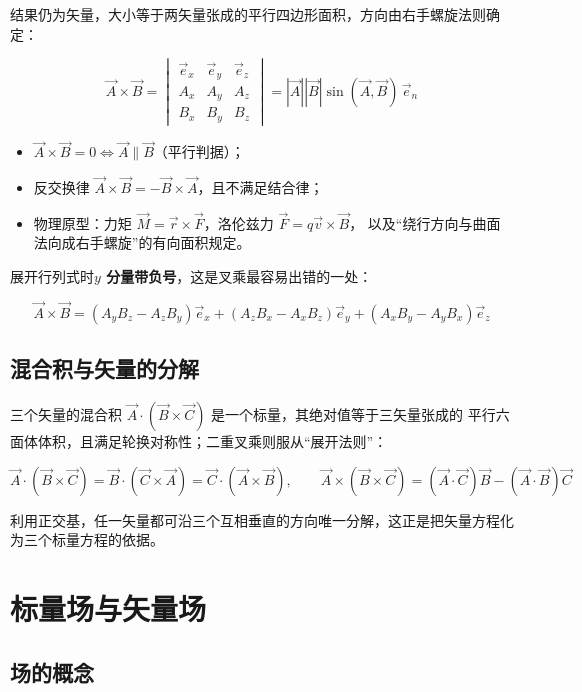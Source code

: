 结果仍为矢量，大小等于两矢量张成的平行四边形面积，方向由右手螺旋法则确定：
\begin{formulaBox}
\[
\vec{A}\times\vec{B}=
\begin{vmatrix}
\vec{e}_x & \vec{e}_y & \vec{e}_z\\
A_x & A_y & A_z\\
B_x & B_y & B_z
\end{vmatrix}
=|\vec{A}||\vec{B}|\sin(\vec{A},\vec{B})\,\vec{e}_n
\]
\end{formulaBox}

\begin{itemize}
    \item $\vec{A}\times\vec{B}=0\iff \vec{A}\parallel\vec{B}$（平行判据）；
    \item 反交换律 $\vec{A}\times\vec{B}=-\vec{B}\times\vec{A}$，且不满足结合律；
    \item 物理原型：力矩 $\vec{M}=\vec{r}\times\vec{F}$，洛伦兹力 $\vec{F}=q\vec{v}\times\vec{B}$，
    以及“绕行方向与曲面法向成右手螺旋”的有向面积规定。
\end{itemize}

展开行列式时\textbf{$y$ 分量带负号}，这是叉乘最容易出错的一处：
\begin{formulaBox}
\[
\vec{A}\times\vec{B}=(A_yB_z-A_zB_y)\vec{e}_x+(A_zB_x-A_xB_z)\vec{e}_y+(A_xB_y-A_yB_x)\vec{e}_z
\]
\end{formulaBox}

\subsection{混合积与矢量的分解}

三个矢量的混合积 $\vec{A}\cdot(\vec{B}\times\vec{C})$ 是一个标量，其绝对值等于三矢量张成的
平行六面体体积，且满足轮换对称性；二重叉乘则服从“展开法则”：
\begin{formulaBox}
\[
\vec{A}\cdot(\vec{B}\times\vec{C})=\vec{B}\cdot(\vec{C}\times\vec{A})=\vec{C}\cdot(\vec{A}\times\vec{B}),\qquad
\vec{A}\times(\vec{B}\times\vec{C})=(\vec{A}\cdot\vec{C})\vec{B}-(\vec{A}\cdot\vec{B})\vec{C}
\]
\end{formulaBox}

利用正交基，任一矢量都可沿三个互相垂直的方向唯一分解，这正是把矢量方程化为三个标量方程的依据。

\section{标量场与矢量场}

\subsection{场的概念}

